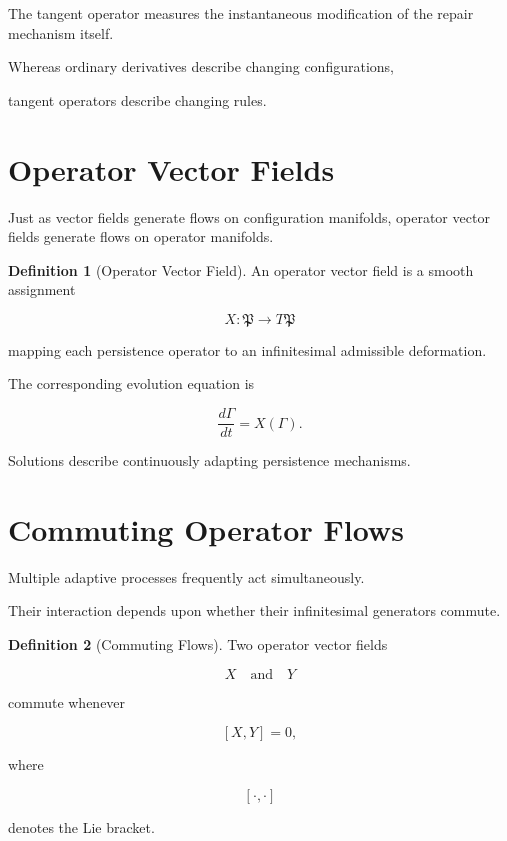 \documentclass[11pt]{book}
\numberwithin{equation}{chapter}
\theoremstyle{definition}
\newtheorem{definition}{Definition}[chapter]
\theoremstyle{plain}
\begin{document}
The tangent operator measures the instantaneous modification of the
repair mechanism itself.

Whereas ordinary derivatives describe changing configurations,

tangent operators describe changing rules.

\section{Operator Vector Fields}

Just as vector fields generate flows on configuration manifolds,
operator vector fields generate flows on operator manifolds.

\begin{definition}[Operator Vector Field]

An operator vector field is a smooth assignment

\[
X:
\mathfrak P
\rightarrow
T\mathfrak P
\]

mapping each persistence operator to an infinitesimal admissible
deformation.

\end{definition}

The corresponding evolution equation is

\[
\frac{d\Gamma}{dt}
=
X(\Gamma).
\]

Solutions describe continuously adapting persistence mechanisms.

\section{Commuting Operator Flows}

Multiple adaptive processes frequently act simultaneously.

Their interaction depends upon whether their infinitesimal generators
commute.

\begin{definition}[Commuting Flows]

Two operator vector fields

\[
X
\quad\text{and}\quad
Y
\]

commute whenever

\[
[X,Y]
=
0,
\]

where

\[
[\cdot,\cdot]
\]

denotes the Lie bracket.

\end{definition}
\end{document}
